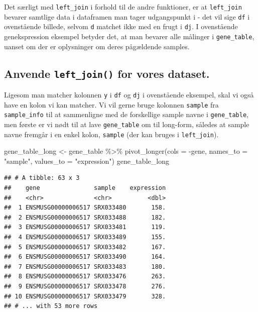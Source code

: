 \documentclass[
]{book}
\newenvironment{Shaded}{\begin{snugshade}}{\end{snugshade}}
\newcommand{\AttributeTok}[1]{\textcolor[rgb]{0.77,0.63,0.00}{#1}}
\newcommand{\FunctionTok}[1]{\textcolor[rgb]{0.00,0.00,0.00}{#1}}
\newcommand{\NormalTok}[1]{#1}
\newcommand{\OtherTok}[1]{\textcolor[rgb]{0.56,0.35,0.01}{#1}}
\newcommand{\SpecialCharTok}[1]{\textcolor[rgb]{0.00,0.00,0.00}{#1}}
\newcommand{\StringTok}[1]{\textcolor[rgb]{0.31,0.60,0.02}{#1}}
\begin{document}
Det særligt med \texttt{left\_join} i forhold til de andre funktioner, er at \texttt{left\_join} bevarer samtlige data i dataframen man tager udgangspunkt i - det vil sige \texttt{df} i ovenstående billede, selvom \texttt{d} matchet ikke med en frugt i \texttt{dj}. I ovenstående genekspression eksempel betyder det, at man bevarer alle målinger i \texttt{gene\_table}, uanset om der er oplysninger om deres pågældende samples.

\hypertarget{anvende-left_join-for-vores-dataset.}{%
\subsection{\texorpdfstring{Anvende \texttt{left\_join()} for vores dataset.}{Anvende left\_join() for vores dataset.}}\label{anvende-left_join-for-vores-dataset.}}

Ligesom man matcher kolonnen \texttt{y} i \texttt{df} og \texttt{dj} i ovenstående eksempel, skal vi også have en kolon vi kan matcher. Vi vil gerne bruge kolonnen \texttt{sample} fra \texttt{sample\_info} til at sammenligne med de forskellige sample navne i \texttt{gene\_table}, men første er vi nødt til at lave \texttt{gene\_table} om til long-form, således at sample navne fremgår i en enkel kolon, \texttt{sample} (der kan bruges i \texttt{left\_join}).

\begin{Shaded}
\begin{Highlighting}[]
\NormalTok{gene\_table\_long }\OtherTok{\textless{}{-}}\NormalTok{ gene\_table }\SpecialCharTok{\%\textgreater{}\%} 
  \FunctionTok{pivot\_longer}\NormalTok{(}\AttributeTok{cols =} \SpecialCharTok{{-}}\NormalTok{gene,}
               \AttributeTok{names\_to =} \StringTok{"sample"}\NormalTok{,}
               \AttributeTok{values\_to =} \StringTok{"expression"}\NormalTok{) }
\NormalTok{gene\_table\_long}
\end{Highlighting}
\end{Shaded}

\begin{verbatim}
## # A tibble: 63 x 3
##    gene               sample    expression
##    <chr>              <chr>          <dbl>
##  1 ENSMUSG00000006517 SRX033480       158.
##  2 ENSMUSG00000006517 SRX033488       182.
##  3 ENSMUSG00000006517 SRX033481       119.
##  4 ENSMUSG00000006517 SRX033489       155.
##  5 ENSMUSG00000006517 SRX033482       167.
##  6 ENSMUSG00000006517 SRX033490       164.
##  7 ENSMUSG00000006517 SRX033483       180.
##  8 ENSMUSG00000006517 SRX033476       263.
##  9 ENSMUSG00000006517 SRX033478       276.
## 10 ENSMUSG00000006517 SRX033479       328.
## # ... with 53 more rows
\end{verbatim}
\end{document}

